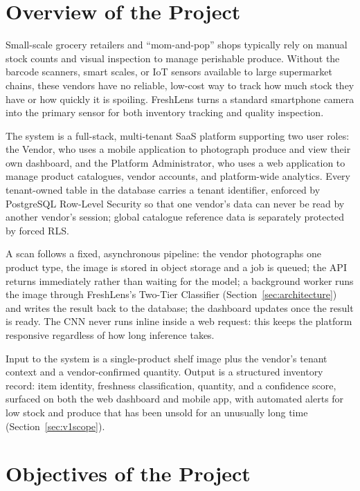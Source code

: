 \documentclass[12pt,a4paper]{article}
\begin{document}
\section{Overview of the Project}

Small-scale grocery retailers and ``mom-and-pop'' shops typically rely on manual stock counts and visual inspection to manage perishable produce. Without the barcode scanners, smart scales, or IoT sensors available to large supermarket chains, these vendors have no reliable, low-cost way to track how much stock they have or how quickly it is spoiling. FreshLens turns a standard smartphone camera into the primary sensor for both inventory tracking and quality inspection.

The system is a full-stack, multi-tenant SaaS platform supporting two user roles: the Vendor, who uses a mobile application to photograph produce and view their own dashboard, and the Platform Administrator, who uses a web application to manage product catalogues, vendor accounts, and platform-wide analytics. Every tenant-owned table in the database carries a tenant identifier, enforced by PostgreSQL Row-Level Security so that one vendor's data can never be read by another vendor's session; global catalogue reference data is separately protected by forced RLS.

A scan follows a fixed, asynchronous pipeline: the vendor photographs one product type, the image is stored in object storage and a job is queued; the API returns immediately rather than waiting for the model; a background worker runs the image through FreshLens's Two-Tier Classifier (Section~\ref{sec:architecture}) and writes the result back to the database; the dashboard updates once the result is ready. The CNN never runs inline inside a web request: this keeps the platform responsive regardless of how long inference takes.

Input to the system is a single-product shelf image plus the vendor's tenant context and a vendor-confirmed quantity. Output is a structured inventory record: item identity, freshness classification, quantity, and a confidence score, surfaced on both the web dashboard and mobile app, with automated alerts for low stock and produce that has been unsold for an unusually long time (Section~\ref{sec:v1scope}).


\newpage
\section{Objectives of the Project}
\end{document}
